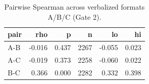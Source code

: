 \begin{table}
\caption{Pairwise Spearman across verbalized formats A/B/C (Gate 2).}
\label{tab:t5_h0_format_agreement}
\begin{tabular}{lrrrrr}
\toprule
pair & rho & p & n & lo & hi \\
\midrule
A-B & -0.016 & 0.437 & 2267 & -0.055 & 0.023 \\
A-C & -0.019 & 0.373 & 2258 & -0.060 & 0.022 \\
B-C & 0.366 & 0.000 & 2282 & 0.332 & 0.398 \\
\bottomrule
\end{tabular}
\end{table}
